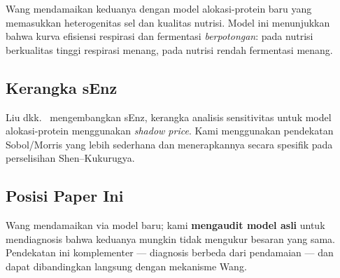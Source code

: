 Wang \cite{wang2025} mendamaikan keduanya dengan model alokasi-protein
baru yang memasukkan heterogenitas sel dan kualitas nutrisi. Model ini
menunjukkan bahwa kurva efisiensi respirasi dan fermentasi
\textit{berpotongan}: pada nutrisi berkualitas tinggi respirasi menang,
pada nutrisi rendah fermentasi menang.

\subsection{Kerangka sEnz}

Liu dkk.\ \cite{senz2024} mengembangkan sEnz, kerangka analisis
sensitivitas untuk model alokasi-protein menggunakan \textit{shadow price}.
Kami menggunakan pendekatan Sobol/Morris yang lebih sederhana dan
menerapkannya secara spesifik pada perselisihan Shen--Kukurugya.

\subsection{Posisi Paper Ini}

Wang mendamaikan via model baru; kami \textbf{mengaudit model asli}
untuk mendiagnosis bahwa keduanya mungkin tidak mengukur besaran
yang sama. Pendekatan ini komplementer --- diagnosis berbeda dari
pendamaian --- dan dapat dibandingkan langsung dengan mekanisme Wang.
